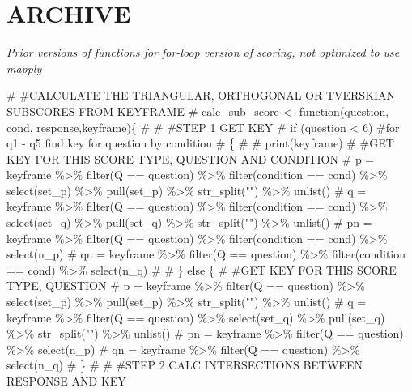 \documentclass[
  letterpaper,
  DIV=11,
  numbers=noendperiod]{scrreprt}
\newenvironment{Shaded}{\begin{snugshade}}{\end{snugshade}}
\newcommand{\CommentTok}[1]{\textcolor[rgb]{0.37,0.37,0.37}{#1}}
\begin{document}
\hypertarget{archive}{%
\section{ARCHIVE}\label{archive}}

\emph{Prior versions of functions for for-loop version of scoring, not
optimized to use mapply}

\begin{Shaded}
\begin{Highlighting}[]
\CommentTok{\# \#CALCULATE THE TRIANGULAR, ORTHOGONAL OR TVERSKIAN SUBSCORES FROM KEYFRAME}
\CommentTok{\# calc\_sub\_score \textless{}{-} function(question, cond, response,keyframe)\{}
\CommentTok{\# }
\CommentTok{\#   \#STEP 1 GET KEY}
\CommentTok{\#   if (question \textless{} 6) \#for q1 {-} q5 find key for question by condition}
\CommentTok{\#   \{}
\CommentTok{\#     \# print(keyframe)}
\CommentTok{\#     \#GET KEY FOR THIS SCORE TYPE, QUESTION AND CONDITION}
\CommentTok{\#     p =  keyframe \%\textgreater{}\% filter(Q == question) \%\textgreater{}\% filter(condition == cond) \%\textgreater{}\% select(set\_p) \%\textgreater{}\% pull(set\_p) \%\textgreater{}\% str\_split("") \%\textgreater{}\% unlist()}
\CommentTok{\#     q =  keyframe \%\textgreater{}\% filter(Q == question) \%\textgreater{}\% filter(condition == cond) \%\textgreater{}\% select(set\_q) \%\textgreater{}\% pull(set\_q) \%\textgreater{}\% str\_split("") \%\textgreater{}\% unlist()}
\CommentTok{\#     pn = keyframe \%\textgreater{}\% filter(Q == question) \%\textgreater{}\% filter(condition == cond) \%\textgreater{}\% select(n\_p)}
\CommentTok{\#     qn = keyframe \%\textgreater{}\% filter(Q == question) \%\textgreater{}\% filter(condition == cond) \%\textgreater{}\% select(n\_q)}
\CommentTok{\# }
\CommentTok{\#   \} else \{}
\CommentTok{\#     \#GET KEY FOR THIS SCORE TYPE, QUESTION}
\CommentTok{\#     p =  keyframe \%\textgreater{}\% filter(Q == question) \%\textgreater{}\% select(set\_p) \%\textgreater{}\% pull(set\_p) \%\textgreater{}\% str\_split("") \%\textgreater{}\% unlist()}
\CommentTok{\#     q =  keyframe \%\textgreater{}\% filter(Q == question) \%\textgreater{}\% select(set\_q) \%\textgreater{}\% pull(set\_q) \%\textgreater{}\% str\_split("") \%\textgreater{}\% unlist()}
\CommentTok{\#     pn = keyframe \%\textgreater{}\% filter(Q == question) \%\textgreater{}\% select(n\_p)}
\CommentTok{\#     qn = keyframe \%\textgreater{}\% filter(Q == question) \%\textgreater{}\% select(n\_q)}
\CommentTok{\#   \}}
\CommentTok{\# }
\CommentTok{\#   \#STEP 2 CALC INTERSECTIONS BETWEEN RESPONSE AND KEY}

\end{Highlighting}
\end{Shaded}
\end{document}
